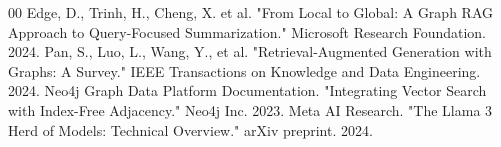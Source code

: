 \documentclass[12pt,a4paper]{report}
\begin{document}
\clearpage


\begin{thebibliography}{00}
	 Edge, D., Trinh, H., Cheng, X. et al. "From Local to Global: A Graph RAG Approach to Query-Focused Summarization." Microsoft Research Foundation. 2024.
	 Pan, S., Luo, L., Wang, Y., et al. "Retrieval-Augmented Generation with Graphs: A Survey." IEEE Transactions on Knowledge and Data Engineering. 2024.
	 Neo4j Graph Data Platform Documentation. "Integrating Vector Search with Index-Free Adjacency." Neo4j Inc. 2023.
	 Meta AI Research. "The Llama 3 Herd of Models: Technical Overview." arXiv preprint. 2024.
\end{thebibliography}

\end{document}
